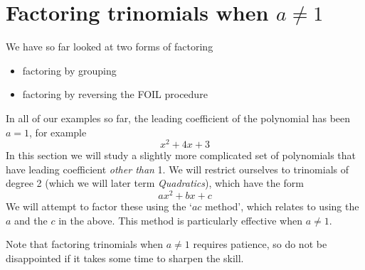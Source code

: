 \section{Factoring trinomials when $a\ne 1$}
%
We have so far looked at two forms of factoring
\begin{itemize}
	\item factoring by grouping
	\item factoring by reversing the FOIL procedure
\end{itemize} 
In all of our examples so far, the leading coefficient of the polynomial has been $a=1$,
for example
\[
	x^2+4x+3
\]
In this section we will study a slightly more complicated set of polynomials that have leading
coefficient {\em other than} 1. We will restrict ourselves to trinomials of \gls{degree} 2 (which we will
later term {\em Quadratics}), which have the form
\[
	ax^2+bx+c
\]
We will attempt to factor these using the `$ac$ method', which relates to using the $a$ and the $c$
in the above. This method is particularly effective when $a\ne 1$.

Note that factoring trinomials when $a\ne 1$ requires patience, so do not be disappointed if it
takes some time to sharpen the skill.

